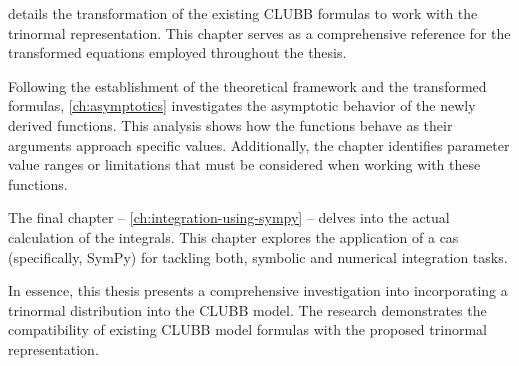 details the transformation of the existing \gls{CLUBB} formulas to work with the trinormal representation.
This chapter serves as a comprehensive reference for the transformed equations employed throughout the thesis.

Following the establishment of the theoretical framework and the transformed formulas,
\cref{ch:asymptotics} investigates the asymptotic behavior of the newly derived functions.
This analysis shows how the functions behave as their arguments approach specific values.
Additionally, the chapter identifies parameter value ranges or limitations
that must be considered when working with these functions.

The final chapter -- \cref{ch:integration-using-sympy} --
delves into the actual calculation of the integrals.
This chapter explores the application of a \gls{cas} (specifically, SymPy)
for tackling both, symbolic and numerical integration tasks.

In essence,
this thesis presents a comprehensive investigation
into incorporating a trinormal distribution into the \gls{CLUBB} model.
The research demonstrates the compatibility of existing \gls{CLUBB} model formulas
with the proposed trinormal representation.
